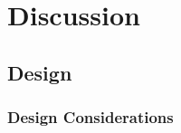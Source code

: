 \documentclass[conference]{IEEEtran}
\begin{document}

\section{Discussion}
\label{sec:discussion}
\subsection{Design}
\subsubsection*{Design Considerations}
\end{document}
